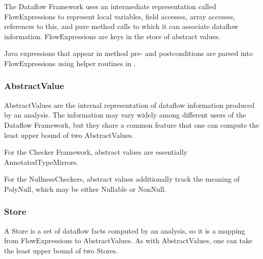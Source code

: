     The Dataflow Framework uses an intermediate representation called FlowExpressions to represent local variables, field accesses, array accesses, references to this, and pure method calls to which it can associate dataflow information.  FlowExpressions are keys in the store of abstract values.

    
    Java expressions that appear in method pre- and postconditions are parsed into FlowExpressions using helper routines in .

    
\subsubsection{AbstractValue}
\label{sec:abstract_value_classes}

    AbstractValues are the internal representation of dataflow information produced by an analysis.  The information may vary widely among different users of the Dataflow Framework, but they share a common feature that one can compute the least upper bound of two AbstractValues.

        
    For the Checker Framework, abstract values are essentially AnnotatedTypeMirrors.
        
        
        
    For the NullnessCheckers, abstract values additionally track the meaning of PolyNull, which may be either Nullable or NonNull.
        
        

\subsubsection{Store}
\label{sec:store_classes}

    A Store is a set of dataflow facts computed by an analysis, so it is a mapping from FlowExpressions to AbstractValues.  As with AbstractValues, one can take the least upper bound of two Stores.

